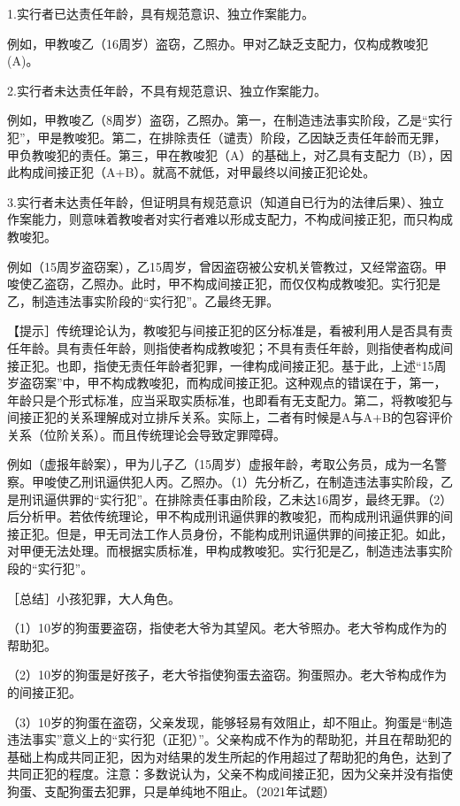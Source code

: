 1.实行者已达责任年龄，具有规范意识、独立作案能力。

例如，甲教唆乙（16周岁）盗窃，乙照办。甲对乙缺乏支配力，仅构成教唆犯(A)。

2.实行者未达责任年龄，不具有规范意识、独立作案能力。

例如，甲教唆乙（8周岁）盗窃，乙照办。第一，在制造违法事实阶段，乙是“实行犯”，甲是教唆犯。第二，在排除责任（谴责）阶段，乙因缺乏责任年龄而无罪，甲负教唆犯的责任。第三，甲在教唆犯（A）的基础上，对乙具有支配力（B），因此构成间接正犯（A+B）。就高不就低，对甲最终以间接正犯论处。

3.实行者未达责任年龄，但证明具有规范意识（知道自已行为的法律后果）、独立作案能力，则意味着教唆者对实行者难以形成支配力，不构成间接正犯，而只构成教唆犯。

例如（15周岁盗窃案），乙15周岁，曾因盗窃被公安机关管教过，又经常盗窃。甲唆使乙盗窃，乙照办。此时，甲不构成间接正犯，而仅仅构成教唆犯。实行犯是乙，制造违法事实阶段的“实行犯”。乙最终无罪。

【提示］传统理论认为，教唆犯与间接正犯的区分标准是，看被利用人是否具有责任年龄。具有责任年龄，则指使者构成教唆犯；不具有责任年龄，则指使者构成间接正犯。也即，指使无责任年龄者犯罪，一律构成间接正犯。基于此，上述“15周岁盗窃案”中，甲不构成教唆犯，而构成间接正犯。这种观点的错误在于，第一，年龄只是个形式标准，应当采取实质标准，也即看有无支配力。第二，将教唆犯与间接正犯的关系理解成对立排斥关系。实际上，二者有时候是A与A+B的包容评价关系（位阶关系）。而且传统理论会导致定罪障碍。

例如（虚报年龄案），甲为儿子乙（15周岁）虚报年龄，考取公务员，成为一名警察。甲唆使乙刑讯逼供犯人丙。乙照办。（1）先分析乙，在制造违法事实阶段，乙是刑讯逼供罪的“实行犯”。在排除责任事由阶段，乙未达16周岁，最终无罪。（2）后分析甲。若依传统理论，甲不构成刑讯逼供罪的教唆犯，而构成刑讯逼供罪的间接正犯。但是，甲无司法工作人员身份，不能构成刑讯逼供罪的间接正犯。如此，对甲便无法处理。而根据实质标准，甲构成教唆犯。实行犯是乙，制造违法事实阶段的“实行犯”。

［总结］小孩犯罪，大人角色。

（1）10岁的狗蛋要盗窃，指使老大爷为其望风。老大爷照办。老大爷构成作为的帮助犯。

（2）10岁的狗蛋是好孩子，老大爷指使狗蛋去盗窃。狗蛋照办。老大爷构成作为的间接正犯。

（3）10岁的狗蛋在盗窃，父亲发现，能够轻易有效阻止，却不阻止。狗蛋是“制造违法事实”意义上的“实行犯（正犯）”。父亲构成不作为的帮助犯，并且在帮助犯的基础上构成共同正犯，因为对结果的发生所起的作用超过了帮助犯的角色，达到了共同正犯的程度。注意：多数说认为，父亲不构成间接正犯，因为父亲并没有指使狗蛋、支配狗蛋去犯罪，只是单纯地不阻止。（2021年试题）

